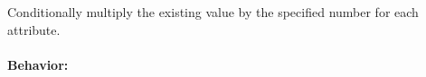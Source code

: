 Conditionally multiply the existing value by the specified number for each
attribute.

\paragraph{Behavior:}
\begin{itemize}[noitemsep]


\end{itemize}
